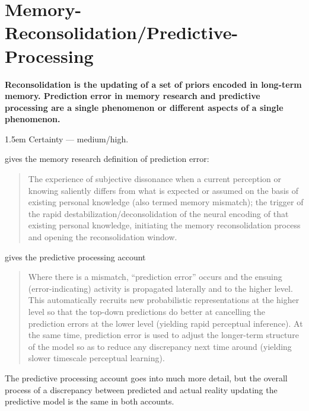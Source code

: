 \documentclass[11pt,oneside]{book}
\newcommand{\claim}[2]{%
    \par\medskip\noindent\textbf{#1}%
    \begin{adjustwidth}{1.5em}{}%
    \setlength{\parindent}{0pt}%
    \setlength{\parskip}{0.5\baselineskip}%
    #2%
    \end{adjustwidth}%
}
\begin{document}
\section*{Memory-Reconsolidation/Predictive-Processing}
\claim{Reconsolidation is the updating of a set of priors encoded in long-term memory. Prediction error in memory research and predictive processing are a single phenomenon or different aspects of a single phenomenon.}{Certainty --- medium/high.

\textcite[p. 367]{eckerUnlocking} gives the memory research definition of prediction error:
\begin{quotation}
    The experience of subjective dissonance when a current perception or knowing saliently differs from what is expected or assumed on the basis of existing personal knowledge (also termed memory mismatch); the trigger of the rapid destabilization/deconsolidation of the neural encoding of that existing personal knowledge, initiating the memory reconsolidation process and opening the reconsolidation window.
\end{quotation}

\textcite[p. 30--31]{clark2015surfing} gives the predictive processing account
\begin{quotation}
    Where there is a mismatch, \enquote{prediction error} occurs and the ensuing (error-indicating) activity is propagated laterally and to the higher level. This automatically recruits new probabilistic representations at the higher level so that the top-down predictions do better at cancelling the prediction errors at the lower level (yielding rapid perceptual inference). At the same time, prediction error is used to adjust the longer-term structure of the model so as to reduce any discrepancy next time around (yielding slower timescale perceptual learning).
\end{quotation}

The predictive processing account goes into much more detail, but the overall process of a discrepancy between predicted and actual reality updating the predictive model is the same in both accounts.}
\end{document}
